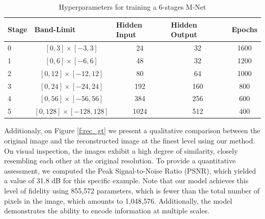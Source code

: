 \begin{table}[h]
\small
\centering
\begin{tabular}{|l|c|c|c|c|}
\hline
\textbf{Stage} & \multicolumn{1}{l|}{\textbf{Band-Limit}} & \multicolumn{1}{l|}{\textbf{Hidden Input}} & \multicolumn{1}{l|}{\textbf{Hidden Output}} & \multicolumn{1}{l|}{\textbf{Epochs}} \\ \hline
 0     & $[0, 3]\times[-3, 3]$                       & 24                                & 32          &  1600                     \\
 1     & $[0, 6]\times[-6, 6]$                       & 48                                & 32         &  1200                      \\
 2     & $[0, 12]\times[-12, 12]$                     & 80                                & 64             & 1000                   \\
 3     & $[0, 24]\times[-24, 24]$                     & 192                               & 160           &   800                  \\
 4     & $[0, 56]\times[-56, 56]$                     & 384                               & 256             &  600                 \\
 5     & $[0, 128]\times[-128, 128]$                   & 1024                              & 512            &   400                 \\ \hline
\end{tabular}
\caption{Hyperparameters for training a 6-stages M-Net}
\end{table}\label{tab:mnet-architecture}


Additionaly, on Figure \ref{f:rec_gt} we present a qualitative comparison between the original image and the reconstructed image at the finest level using our method. On visual inspection, the images exhibit a high degree of similarity, closely resembling each other at the original resolution. To provide a quantitative assessment, we computed the Peak Signal-to-Noise Ratio (PSNR), which yielded a value of 31.8 dB for this specific example. Note that our model achieves this level of fidelity using 855,572 parameters, which is fewer than the total number of pixels in the image, which amounts to 1,048,576. Additionally, the model demonstrates the ability to encode information at multiple scales.

